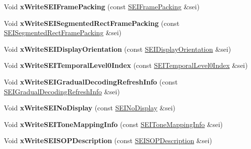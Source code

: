 \begin{DoxyCompactItemize}
\item 
\mbox{\label{class_s_e_i_writer_ad2daee80f3eccfcae590359fb54fa780}} 
Void {\bfseries x\+Write\+S\+E\+I\+Frame\+Packing} (const \hyperlink{class_s_e_i_frame_packing}{S\+E\+I\+Frame\+Packing} \&sei)
\item 
\mbox{\label{class_s_e_i_writer_a8d49d07d414d945844bcef1976ae35db}} 
Void {\bfseries x\+Write\+S\+E\+I\+Segmented\+Rect\+Frame\+Packing} (const \hyperlink{class_s_e_i_segmented_rect_frame_packing}{S\+E\+I\+Segmented\+Rect\+Frame\+Packing} \&sei)
\item 
\mbox{\label{class_s_e_i_writer_a136668b85ad67fa06b57a822aad7528a}} 
Void {\bfseries x\+Write\+S\+E\+I\+Display\+Orientation} (const \hyperlink{class_s_e_i_display_orientation}{S\+E\+I\+Display\+Orientation} \&sei)
\item 
\mbox{\label{class_s_e_i_writer_a97fdd4a751ab134fda67b9378255706b}} 
Void {\bfseries x\+Write\+S\+E\+I\+Temporal\+Level0\+Index} (const \hyperlink{class_s_e_i_temporal_level0_index}{S\+E\+I\+Temporal\+Level0\+Index} \&sei)
\item 
\mbox{\label{class_s_e_i_writer_a488a47082ad6295430670a243d21832c}} 
Void {\bfseries x\+Write\+S\+E\+I\+Gradual\+Decoding\+Refresh\+Info} (const \hyperlink{class_s_e_i_gradual_decoding_refresh_info}{S\+E\+I\+Gradual\+Decoding\+Refresh\+Info} \&sei)
\item 
\mbox{\label{class_s_e_i_writer_acd3265240433e25da5c5b2b16fb3502b}} 
Void {\bfseries x\+Write\+S\+E\+I\+No\+Display} (const \hyperlink{class_s_e_i_no_display}{S\+E\+I\+No\+Display} \&sei)
\item 
\mbox{\label{class_s_e_i_writer_aae13134e73be50fdf312952f70b56bca}} 
Void {\bfseries x\+Write\+S\+E\+I\+Tone\+Mapping\+Info} (const \hyperlink{class_s_e_i_tone_mapping_info}{S\+E\+I\+Tone\+Mapping\+Info} \&sei)
\item 
\mbox{\label{class_s_e_i_writer_a2115bcc1fd2c573c221d95eb4905a6d9}} 
Void {\bfseries x\+Write\+S\+E\+I\+S\+O\+P\+Description} (const \hyperlink{class_s_e_i_s_o_p_description}{S\+E\+I\+S\+O\+P\+Description} \&sei)

\end{DoxyCompactItemize}
